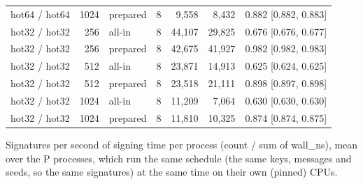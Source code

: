 \begin{table}[t]
{\begin{tabular}{lrlrrrl}
hot64 / hot64 & 1024 & prepared & 8 & 9{,}558 & 8{,}432 & 0.882 [0.882, 0.883] \\
hot32 / hot32 & 256 & all-in & 8 & 44{,}107 & 29{,}825 & 0.676 [0.676, 0.677] \\
hot32 / hot32 & 256 & prepared & 8 & 42{,}675 & 41{,}927 & 0.982 [0.982, 0.983] \\
hot32 / hot32 & 512 & all-in & 8 & 23{,}871 & 14{,}913 & 0.625 [0.624, 0.625] \\
hot32 / hot32 & 512 & prepared & 8 & 23{,}518 & 21{,}111 & 0.898 [0.897, 0.898] \\
hot32 / hot32 & 1024 & all-in & 8 & 11{,}209 & 7{,}064 & 0.630 [0.630, 0.630] \\
hot32 / hot32 & 1024 & prepared & 8 & 11{,}810 & 10{,}325 & 0.874 [0.874, 0.875] \\
\bottomrule
\end{tabular}}
\par\smallskip\parbox{\linewidth}{\scriptsize Signatures per second of signing time per process (count / sum of wall\_ns), mean over the P processes, which run the same schedule (the same keys, messages and seeds, so the same signatures) at the same time on their own (pinned) CPUs.}
\end{table}

